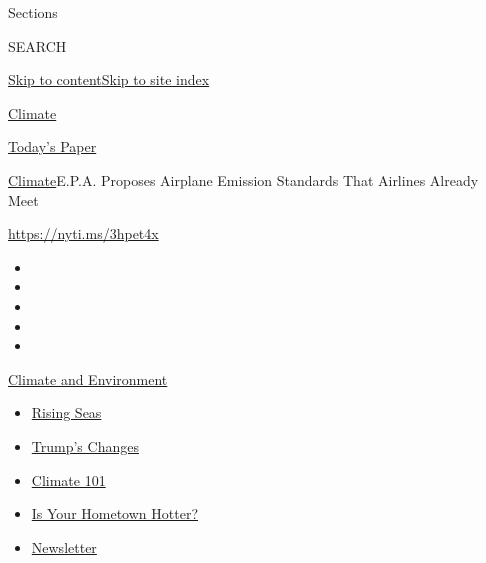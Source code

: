 Sections

SEARCH

\protect\hyperlink{site-content}{Skip to
content}\protect\hyperlink{site-index}{Skip to site index}

\href{https://www.nytimes3xbfgragh.onion/section/climate}{Climate}

\href{https://myaccount.nytimes3xbfgragh.onion/auth/login?response_type=cookie\&client_id=vi}{}

\href{https://www.nytimes3xbfgragh.onion/section/todayspaper}{Today's
Paper}

\href{/section/climate}{Climate}\textbar{}E.P.A. Proposes Airplane
Emission Standards That Airlines Already Meet

\href{https://nyti.ms/3hpet4x}{https://nyti.ms/3hpet4x}

\begin{itemize}
\item
\item
\item
\item
\item
\end{itemize}

\href{https://www.nytimes3xbfgragh.onion/section/climate?action=click\&pgtype=Article\&state=default\&region=TOP_BANNER\&context=storylines_menu}{Climate
and Environment}

\begin{itemize}
\tightlist
\item
  \href{https://www.nytimes3xbfgragh.onion/2020/07/30/climate/sea-level-inland-floods.html?action=click\&pgtype=Article\&state=default\&region=TOP_BANNER\&context=storylines_menu}{Rising
  Seas}
\item
  \href{https://www.nytimes3xbfgragh.onion/interactive/2020/climate/trump-environment-rollbacks.html?action=click\&pgtype=Article\&state=default\&region=TOP_BANNER\&context=storylines_menu}{Trump's
  Changes}
\item
  \href{https://www.nytimes3xbfgragh.onion/interactive/2020/04/19/climate/climate-crash-course-1.html?action=click\&pgtype=Article\&state=default\&region=TOP_BANNER\&context=storylines_menu}{Climate
  101}
\item
  \href{https://www.nytimes3xbfgragh.onion/interactive/2018/08/30/climate/how-much-hotter-is-your-hometown.html?action=click\&pgtype=Article\&state=default\&region=TOP_BANNER\&context=storylines_menu}{Is
  Your Hometown Hotter?}
\item
  \href{https://www.nytimes3xbfgragh.onion/newsletters/climate-change?action=click\&pgtype=Article\&state=default\&region=TOP_BANNER\&context=storylines_menu}{Newsletter}
\end{itemize}

